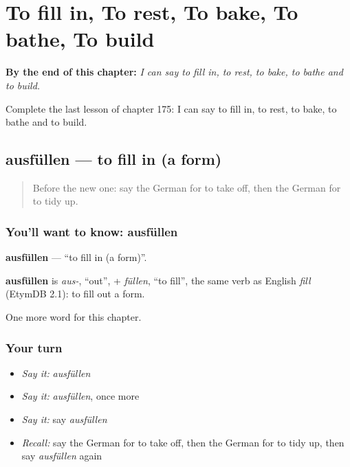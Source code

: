 
\chapter{To fill in, To rest, To bake, To bathe, To build}
\label{ch:ge-to-fill-in-to-rest-to-bake-to-bathe-to-build}

\begin{chapteropening}
\textbf{By the end of this chapter:} \emph{I can say to fill in, to rest, to bake, to bathe and to build.}

Complete the last lesson of chapter 175: I can say to fill in, to rest, to bake, to bathe and to build.
\end{chapteropening}

\section[ausfüllen]{ausfüllen — to fill in (a form)}

\label{lesson:GE-C175-ausfuellen}



\begin{quote}
Before the new one: say the German for to take off, then the German for to tidy up.
\end{quote}

\subsection*{You'll want to know: ausfüllen}
\textbf{ausfüllen} — \textquotedblleft{}to fill in (a form)\textquotedblright{}.

\begin{cousinweb}
\textbf{ausfüllen} is \emph{aus-}, \textquotedblleft{}out\textquotedblright{}, + \emph{füllen}, \textquotedblleft{}to fill\textquotedblright{}, the same verb as English \emph{fill} (EtymDB 2.1): to fill out a form.
\end{cousinweb}

\begin{grammarlens}[title={What you've built}]
One more word for this chapter.
\end{grammarlens}

\subsection*{Your turn}
\begin{itemize}
\raggedright
  \item \emph{Say it:} \emph{ausfüllen}
  \item \emph{Say it:} \emph{ausfüllen}, once more
  \item \emph{Say it:} say \emph{ausfüllen}
  \item \emph{Recall:} say the German for to take off, then the German for to tidy up, then say \emph{ausfüllen} again
\end{itemize}

